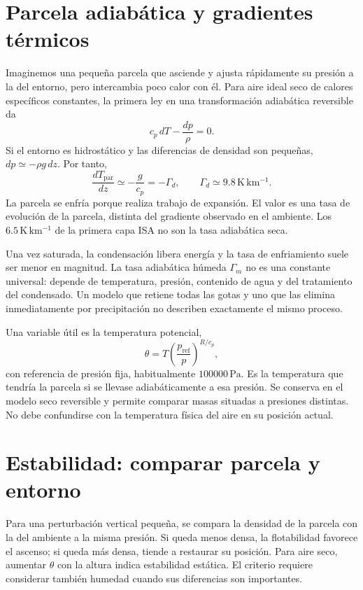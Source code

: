 \section{Parcela adiabática y gradientes térmicos}
Imaginemos una pequeña parcela que asciende y ajusta rápidamente su presión a la del entorno, pero intercambia poco calor con él. Para aire ideal seco de calores específicos constantes, la primera ley en una transformación adiabática reversible da
\begin{equation}
 c_p\,dT-\frac{dp}{\rho}=0.
\end{equation}
Si el entorno es hidrostático y las diferencias de densidad son pequeñas, $dp\simeq-\rho g\,dz$. Por tanto,
\begin{equation}
 \frac{dT_{\mathrm{par}}}{dz}\simeq-\frac{g}{c_p}=-\Gamma_d,
 \qquad \Gamma_d\simeq9.8\,\mathrm{K\,km^{-1}}.
\end{equation}
La parcela se enfría porque realiza trabajo de expansión. El valor es una tasa de evolución de la parcela, distinta del gradiente observado en el ambiente. Los $6.5\,\mathrm{K\,km^{-1}}$ de la primera capa ISA no son la tasa adiabática seca.

Una vez saturada, la condensación libera energía y la tasa de enfriamiento suele ser menor en magnitud. La tasa adiabática húmeda $\Gamma_m$ no es una constante universal: depende de temperatura, presión, contenido de agua y del tratamiento del condensado. Un modelo que retiene todas las gotas y uno que las elimina inmediatamente por precipitación no describen exactamente el mismo proceso.

Una variable útil es la temperatura potencial,
\begin{equation}
 \theta=T\left(\frac{p_{\mathrm{ref}}}{p}\right)^{R/c_p},
\end{equation}
con referencia de presión fija, habitualmente $100000\,\mathrm{Pa}$. Es la temperatura que tendría la parcela si se llevase adiabáticamente a esa presión. Se conserva en el modelo seco reversible y permite comparar masas situadas a presiones distintas. No debe confundirse con la temperatura física del aire en su posición actual.

\section{Estabilidad: comparar parcela y entorno}
Para una perturbación vertical pequeña, se compara la densidad de la parcela con la del ambiente a la misma presión. Si queda menos densa, la flotabilidad favorece el ascenso; si queda más densa, tiende a restaurar su posición. Para aire seco, aumentar $\theta$ con la altura indica estabilidad estática. El criterio requiere considerar también humedad cuando sus diferencias son importantes.

